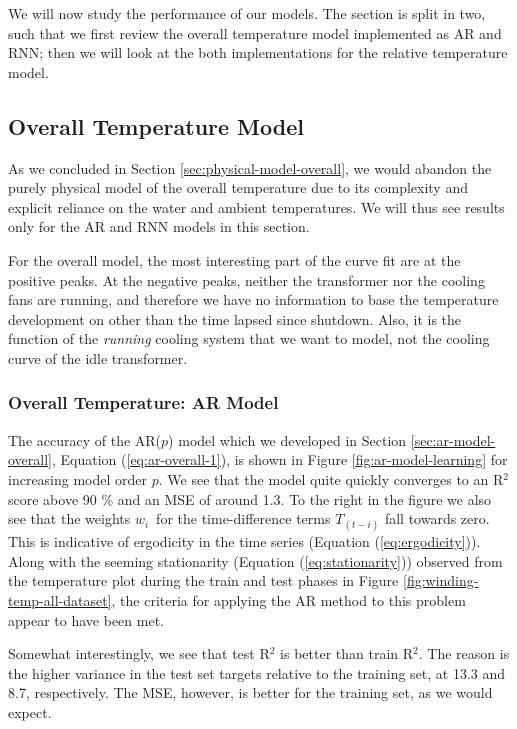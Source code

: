 \documentclass[]{article}
\begin{document}

We will now study the performance of our models. The section is split in two, such that we first review the overall temperature model implemented as AR and RNN; then we will look at the both implementations for the relative temperature model.

\subsection{Overall Temperature Model} \label{sec:results-overall}
As we concluded in Section \ref{sec:physical-model-overall}, we would abandon the purely physical model of the overall temperature due to its complexity and explicit reliance on the water and ambient temperatures. We will thus see results only for the AR and RNN models in this section.

For the overall model, the most interesting part of the curve fit are at the positive peaks. At the negative peaks, neither the transformer nor the cooling fans are running, and therefore we have no information to base the temperature development on other than the time lapsed since shutdown. Also, it is the function of the \textit{running} cooling system that we want to model, not the cooling curve of the idle transformer.

\subsubsection{Overall Temperature: AR Model} \label{sec:results-overall-ar}
The accuracy of the AR($p$) model which we developed in Section \ref{sec:ar-model-overall}, Equation (\ref{eq:ar-overall-1}), is shown in Figure \ref{fig:ar-model-learning} for increasing model order $p$. We see that the model quite quickly converges to an R$^2$ score above 90 \% and an MSE of around 1.3. To the right in the figure we also see that the weights $w_i$ for the time-difference terms $T_{(t-i)}$ fall towards zero. This is indicative of ergodicity in the time series (Equation (\ref{eq:ergodicity})). Along with the seeming stationarity (Equation (\ref{eq:stationarity})) observed from the temperature plot during the train and test phases in Figure \ref{fig:winding-temp-all-dataset}, the criteria for applying the AR method to this problem appear to have been met. 

Somewhat interestingly, we see that test R$^2$ is better than train R$^2$. The reason is the higher variance in the test set targets relative to the training set, at 13.3 and 8.7, respectively. The MSE, however, is better for the training set, as we would expect.
\end{document}
